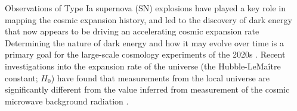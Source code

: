 \documentclass[12pt]{article}
\begin{document}



Observations of Type Ia supernova (SN) explosions have played a key role in mapping the cosmic expansion history, and led to the discovery of dark energy that now appears to be driving an accelerating cosmic expansion rate 
\cite{riess_observational_1998,perlmutter_measurements_1999} %
Determining the nature of dark energy and how it may evolve over time is a primary goal for the large-scale cosmology experiments of the 2020s
\cite{amendola_cosmology_2013,spergel_wide_2015,Ivezic_lsst_2019}.
 Recent investigations into the expansion rate of the universe (the Hubble-LeMa\^itre constant; $H_0$) have found that measurements from the local universe are significantly different from the value inferred from measurement of the cosmic microwave background radiation \cite{Riess_large_2019,aghanim_planck_2018}.  
\end{document}
